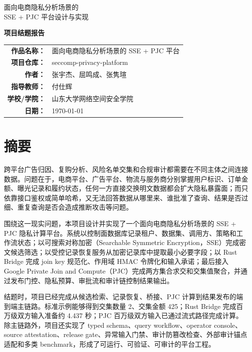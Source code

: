 \documentclass[UTF8,a4paper,12pt,oneside]{ctexrep}
\newcommand{\project}{seccomp-privacy-platform}
\begin{document}
\begin{titlepage}
  \centering
  \vspace*{1.5cm}
  {\heiti 面向电商隐私分析场景的\\[0.3em]SSE + PJC 平台设计与实现\par}
  \vspace{2.8cm}
  {\bfseries 项目结题报告\par}
  \vspace{4.8cm}
  \begin{tabular}{>{\bfseries}r l}
    作品名称： & 面向电商隐私分析场景的 SSE + PJC 平台 \\
    项目仓库： & \project \\
    作者： & 张宇杰、屈鸣成、张隽瑄 \\
    指导教师： & 付仕辉 \\
    学校/学院： & 山东大学网络空间安全学院 \\
    日期： & \today \\
  \end{tabular}
  \vfill
\end{titlepage}


\chapter*{摘要}

跨平台广告归因、复购分析、风险名单交集和合规审计都需要在不同主体之间连接数据。问题在于，电商平台、广告平台、物流与服务商分别掌握用户标识、订单金额、曝光记录和履约状态，任何一方直接交换明文数据都会扩大隐私暴露面；而只依靠接口鉴权或简单哈希，又无法回答数据从哪里来、谁批准了查询、结果是否过细、重复查询是否会造成推断攻击等问题。

围绕这一现实问题，本项目设计并实现了一个面向电商隐私分析场景的 SSE + PJC 隐私计算平台。系统以控制面数据库记录租户、数据集、调用方、策略和工作流状态；以可搜索对称加密（Searchable Symmetric Encryption，SSE）完成密文候选筛选；以受控记录恢复服务从加密记录库中提取最小必要字段；以 Rust Bridge 完成 join key 规范化、作用域 HMAC 令牌化和输入承诺；最后接入 Google Private Join and Compute（PJC）完成两方集合求交和交集值聚合，并通过发布门控、隐私预算、审批流和审计链控制结果输出。

结题时，项目已经完成从候选检索、记录恢复、桥接、PJC 计算到结果发布的端到端主链路。标准示例能够得到交集数量 2、交集金额 425；Rust Bridge 完成百万级双方输入准备约 4.437 秒；PJC 百万级双方输入已通过流式路径完成计算。除主链路外，项目还实现了 typed schema、query workflow、operator console、source attestation、release gate、异常输入门禁、审计防篡改检查、外部审计锚点适配和多类 benchmark，形成了可运行、可验证、可审计的平台工程。
\end{document}
